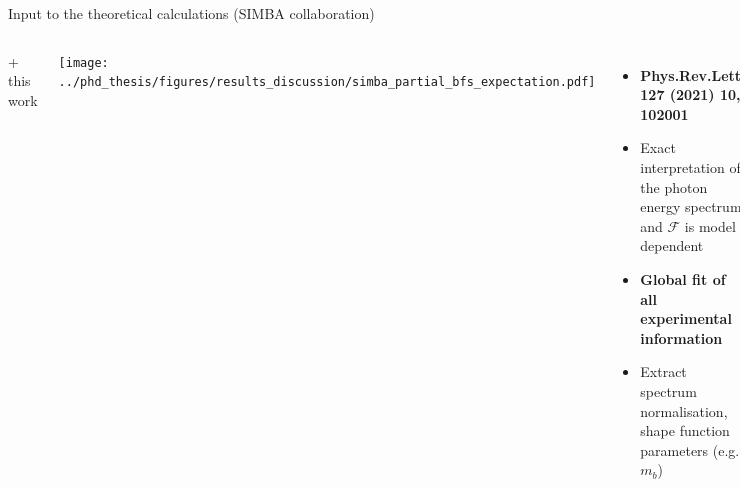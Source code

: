 \documentclass[xcolor=dvipsnames]{beamer}
\begin{document}
\begin{frame}{Input to the theoretical calculations (SIMBA collaboration)}
\begin{columns}
   {\Large + this work}
   
   \texttt{[image: ../phd\_thesis/figures/results\_discussion/simba\_partial\_bfs\_expectation.pdf]}

   \centering
   \begin{itemize}
      \item[]          {\tiny\textbf{Phys.Rev.Lett. 127 (2021) 10, 102001}}
      \item Exact interpretation of the photon energy spectrum and $\mathcal{F}$ is model dependent
      \item \textbf{Global fit of all experimental information}
      \item Extract spectrum normalisation, shape function parameters (e.g. $m_b$)
   \end{itemize}
   \texttt{[image: ../phd\_thesis/figures/results\_discussion/C7incl\_mb\_la055\_henrikas.pdf]}

\end{columns}


\end{frame}   
\end{document}
